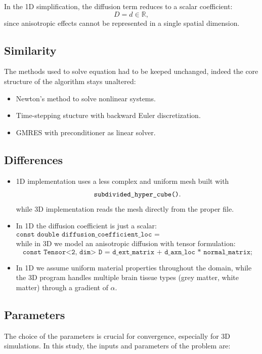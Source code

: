 \documentclass[12pt, a4paper, twoside, openright]{report}
\begin{document}
In the 1D simplification, the diffusion term reduces to a scalar coefficient:
\[
  D = d \in \mathbb{R},
\]
since anisotropic effects cannot be represented in a single spatial dimension.


\subsection{Similarity}
The methods used to solve equation had to be keeped unchanged, indeed the core structure of the algorithm stays unaltered:
\begin{itemize}
  \item Newton's method to solve nonlinear systems.
  \item Time-stepping stucture with backward Euler discretization.
  \item GMRES with preconditioner as linear solver.
\end{itemize}
\subsection{Differences}
\begin{itemize}
  \item 1D implementation uses a less complex and uniform mesh built with
        \[
          \verb|subdivided_hyper_cube()|.
        \]
        while 3D implementation reads the mesh directly from the proper file.

  \item In 1D the diffusion coefficient is just a scalar:
        \[
          \texttt{const double diffusion\_coefficient\_loc = diffusion\_coefficient.value();}
        \]
        while in 3D we model an anisotropic diffusion with tensor formulation:
        \[
          \texttt{const Tensor<2, dim> D = d\_ext\_matrix + d\_axn\_loc * normal\_matrix;}
        \]

  \item In 1D we assume uniform material properties throughout the domain, while the 3D program handles multiple brain tissue types (grey matter, white matter) through a gradient of $\alpha$.
\end{itemize}


\subsection{Parameters}\label{parameters}

The choice of the parameters is crucial for convergence, especially for 3D simulations. In this study, the inputs and parameters of the problem are:
\end{document}
